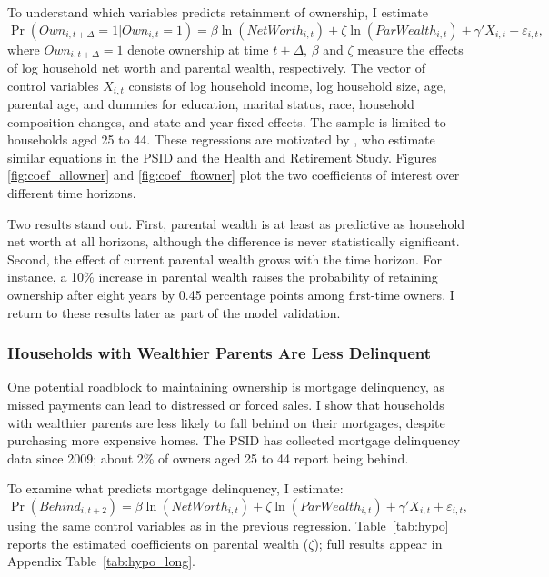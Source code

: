 \documentclass[12pt]{article}
\begin{document}
To understand which variables predicts retainment of ownership, I estimate
\begin{equation}	\label{eq:regmaintain}
	\Pr\left(Own_{i,t+\Delta}=1|Own_{i,t}=1\right)
	= \beta\ln(NetWorth_{i,t}) + \zeta\ln(ParWealth_{i,t})
	  + \gamma' X_{i,t} + \varepsilon_{i,t},
\end{equation}
where $Own_{i,t+\Delta}=1$ denote ownership at time $t+\Delta$, $\beta$ and $\zeta$ measure the effects of log household net worth and parental wealth, respectively. The vector of control variables  $X_{i,t}$ consists of log household income, log household size, age, parental age, and dummies for  education, marital status, race, household composition changes, and state and year fixed effects.  The sample is limited to households aged 25 to 44. These regressions are motivated by \cite{bond2021role}, who estimate similar equations in the PSID and the Health and Retirement Study. Figures \ref{fig:coef_allowner} and \ref{fig:coef_ftowner} plot the two coefficients of interest over different time horizons.

Two results stand out. First, parental wealth is at least as predictive as household net worth at all horizons, although the difference is never statistically significant. Second, the effect of current parental wealth grows with the time horizon. For instance, a 10\% increase in parental wealth raises the probability of retaining ownership after eight years by 0.45 percentage points among first-time owners. I return to these results later as part of the model validation.


\subsubsection{Households with Wealthier Parents Are Less Delinquent} 
One potential roadblock to maintaining ownership is mortgage delinquency, as missed payments can lead to distressed or forced sales. I show that households with wealthier parents are less likely to fall behind on their mortgages, despite purchasing more expensive homes. The PSID has collected mortgage delinquency data since 2009; about 2\% of owners aged 25 to 44 report being behind.

To examine what predicts mortgage delinquency, I estimate: 
\begin{equation}\label{eq:regbehind}
\Pr(Behind_{i,t+2}) = \beta\ln(NetWorth_{i,t}) + \zeta\ln(ParWealth_{i,t}) + \gamma' X_{i,t} + \varepsilon_{i,t},
\end{equation}
using the same control variables as in the previous regression. Table~\ref{tab:hypo} reports the estimated coefficients on parental wealth ($\zeta$); full results appear in Appendix Table~\ref{tab:hypo_long}.  
\end{document}
